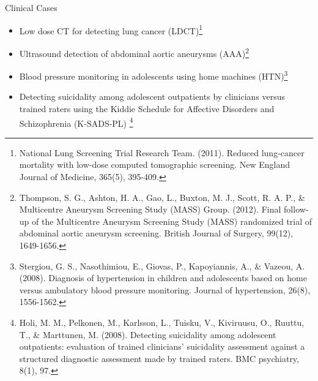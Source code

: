 \documentclass[10pt, xcolor=table]{beamer}
\begin{document}
\begin{frame}{Clinical Cases}
	\begin{itemize}
		\item Low dose CT for detecting lung cancer (LDCT)\footnote{National Lung Screening Trial Research Team. (2011). Reduced lung-cancer mortality with low-dose computed tomographic screening. New England Journal of Medicine, 365(5), 395-409.}
		\item Ultrasound detection of abdominal aortic aneurysms (AAA)\footnote{Thompson, S. G., Ashton, H. A., Gao, L., Buxton, M. J., Scott, R. A. P., \& Multicentre Aneurysm Screening Study (MASS) Group. (2012). Final follow‐up of the Multicentre Aneurysm Screening Study (MASS) randomized trial of abdominal aortic aneurysm screening. British Journal of Surgery, 99(12), 1649-1656.}
		\item Blood pressure monitoring in adolescents using home machines (HTN)\footnote{Stergiou, G. S., Nasothimiou, E., Giovas, P., Kapoyiannis, A., \& Vazeou, A. (2008). Diagnosis of hypertension in children and adolescents based on home versus ambulatory blood pressure monitoring. Journal of hypertension, 26(8), 1556-1562.}
		\item Detecting suicidality among adolescent outpatients by clinicians versus trained raters using the Kiddie Schedule for Affective Disorders and Schizophrenia (K-SADS-PL) \footnote{Holi, M. M., Pelkonen, M., Karlsson, L., Tuisku, V., Kiviruusu, O., Ruuttu, T., \& Marttunen, M. (2008). Detecting suicidality among adolescent outpatients: evaluation of trained clinicians' suicidality assessment against a structured diagnostic assessment made by trained raters. BMC psychiatry, 8(1), 97.}
	\end{itemize}
\end{frame}
\end{document}
